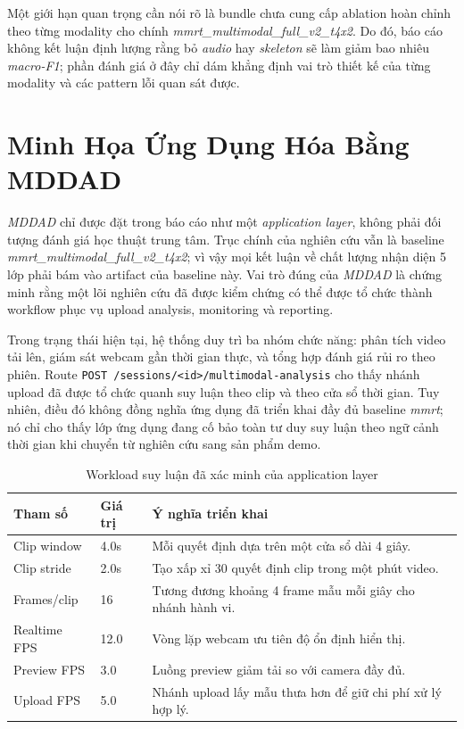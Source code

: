 \documentclass[conference,a4paper]{IEEEtran}
\begin{document}
Một giới hạn quan trọng cần nói rõ là bundle chưa cung cấp ablation hoàn chỉnh theo từng modality cho chính \textit{mmrt\_multimodal\_full\_v2\_t4x2}. Do đó, báo cáo không kết luận định lượng rằng bỏ \textit{audio} hay \textit{skeleton} sẽ làm giảm bao nhiêu \textit{macro-F1}; phần đánh giá ở đây chỉ dám khẳng định vai trò thiết kế của từng modality và các pattern lỗi quan sát được.

\section[Tang Ung Dung Hoa MDDAD]{Minh Họa Ứng Dụng Hóa Bằng MDDAD}
\textit{MDDAD} chỉ được đặt trong báo cáo như một \textit{application layer}, không phải đối tượng đánh giá học thuật trung tâm. Trục chính của nghiên cứu vẫn là baseline \textit{mmrt\_multimodal\_full\_v2\_t4x2}; vì vậy mọi kết luận về chất lượng nhận diện 5 lớp phải bám vào artifact của baseline này. Vai trò đúng của \textit{MDDAD} là chứng minh rằng một lõi nghiên cứu đã được kiểm chứng có thể được tổ chức thành workflow phục vụ upload analysis, monitoring và reporting.

Trong trạng thái hiện tại, hệ thống duy trì ba nhóm chức năng: phân tích video tải lên, giám sát webcam gần thời gian thực, và tổng hợp đánh giá rủi ro theo phiên. Route \texttt{POST /sessions/<id>/multimodal-analysis} cho thấy nhánh upload đã được tổ chức quanh suy luận theo clip và theo cửa sổ thời gian. Tuy nhiên, điều đó không đồng nghĩa ứng dụng đã triển khai đầy đủ baseline \textit{mmrt}; nó chỉ cho thấy lớp ứng dụng đang cố bảo toàn tư duy suy luận theo ngữ cảnh thời gian khi chuyển từ nghiên cứu sang sản phẩm demo.

\begin{table}[t]
\caption{Workload suy luận đã xác minh của application layer}
\label{tab:runtime-config}
\centering
\scriptsize
\begin{tabular}{L{1.55cm}L{0.75cm}L{3.45cm}}
\toprule
Tham số & Giá trị & Ý nghĩa triển khai \\
\midrule
Clip window & 4.0s & Mỗi quyết định dựa trên một cửa sổ dài 4 giây. \\
Clip stride & 2.0s & Tạo xấp xỉ 30 quyết định clip trong một phút video. \\
Frames/clip & 16 & Tương đương khoảng 4 frame mẫu mỗi giây cho nhánh hành vi. \\
Realtime FPS & 12.0 & Vòng lặp webcam ưu tiên độ ổn định hiển thị. \\
Preview FPS & 3.0 & Luồng preview giảm tải so với camera đầy đủ. \\
Upload FPS & 5.0 & Nhánh upload lấy mẫu thưa hơn để giữ chi phí xử lý hợp lý. \\
\bottomrule
\end{tabular}
\end{table}
\end{document}

